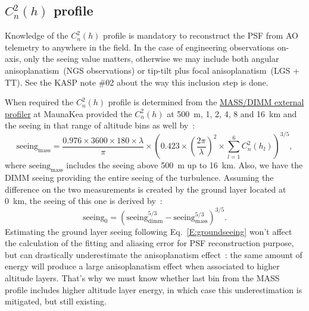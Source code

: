 \documentclass[12pt]{article}
\newcommand{\para}[1]{\left(#1\right)}
\newcommand{\cnh}{C_n^2(h)}
\begin{document}
 
\subsection{$\cnh$ profile}
Knowledge of the $\cnh$ profile is mandatory to reconstruct the PSF from AO telemetry to anywhere in the field. In the case of engineering observations on-axis, only the seeing value matters, otherwise we may include both angular anisoplanatism~(NGS observations) or tip-tilt plus focal anisoplanatism~(LGS + TT). See the KASP note \#02 about the way this inclusion step is done.

When required the $\cnh$ profile is determined from the \href{http://mkwc.ifa.hawaii.edu/current/seeing/}{MASS/DIMM external profiler}  at MaunaKea provided the $\cnh$ at 500~m, 1, 2, 4, 8 and 16~km and the seeing in that range of altitude bins as well by~:
\begin{equation}
	\text{seeing}_\text{mass} = \dfrac{0.976\times3600\times180\times\lambda}{\pi}\times\para{0.423\times\para{\dfrac{2\pi}{\lambda}}^2\times \sum_{l=1}^{6} C_n^2(h_l) }^{3/5},
\end{equation} 
where $\text{seeing}_\text{mass}$ includes the seeing above 500~m up to 16~km. Also, we have the DIMM seeing providing the entire seeing of the turbulence. Assuming the difference on the two measurements is created by the ground layer located at 0~km, the seeing of this one is derived by~:
\begin{equation}\label{E:groundseeing}
	\text{seeing}_\text{0} = \para{\text{seeing}^{5/3}_\text{dimm} - \text{seeing}^{5/3}_\text{mass}}^{3/5}.
\end{equation}
Estimating the ground layer seeing following Eq.~\ref{E:groundseeing} won't affect the calculation of the fitting and aliasing error for PSF reconstruction purpose, but can drastically underestimate the anisoplanatism effect~: the same amount of energy will produce a large anisoplanatism effect when associated to higher altitude layers. That's why we must know whether last bin from the MASS profile includes higher altitude layer energy,
in which case this underestimation is mitigated, but still existing.
\end{document}

